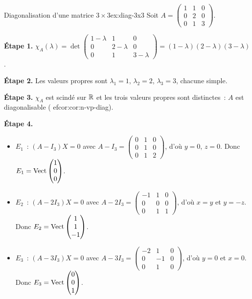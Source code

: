 \begin{example}{Diagonalisation d'une matrice $3\times 3$}{ex:diag-3x3}
  Soit $A=\begin{pmatrix}1&1&0\\0&2&0\\0&1&3\end{pmatrix}$.

  \textbf{Étape 1.}
  $\chi_A(\lambda)=\det\begin{pmatrix}1-\lambda&1&0\\0&2-\lambda&0\\
  0&1&3-\lambda\end{pmatrix}
  =(1-\lambda)(2-\lambda)(3-\lambda)$.

  \textbf{Étape 2.} Les valeurs propres sont $\lambda_1=1$,
  $\lambda_2=2$, $\lambda_3=3$, chacune simple.

  \textbf{Étape 3.} $\chi_A$ est scindé sur ${\mathbb{R}}$ et les trois valeurs
  propres sont distinctes~: $A$ est diagonalisable
  (
ef{cor:cor:n-vp-diag}).

  \textbf{Étape 4.}
  \begin{itemize}
    \item $E_1$~: $(A-I_3)X=0$ avec
      $A-I_3=\begin{pmatrix}0&1&0\\0&1&0\\0&1&2\end{pmatrix}$, d'où
      $y=0$, $z=0$. Donc
      $E_1=\operatorname{Vect}\begin{pmatrix}1\\0\\0\end{pmatrix}$.
    \item $E_2$~: $(A-2I_3)X=0$ avec
      $A-2I_3=\begin{pmatrix}-1&1&0\\0&0&0\\0&1&1\end{pmatrix}$, d'où
      $x=y$ et $y=-z$. Donc
      $E_2=\operatorname{Vect}\begin{pmatrix}1\\1\\-1\end{pmatrix}$.
    \item $E_3$~: $(A-3I_3)X=0$ avec
      $A-3I_3=\begin{pmatrix}-2&1&0\\0&-1&0\\0&1&0\end{pmatrix}$, d'où
      $y=0$ et $x=0$. Donc
      $E_3=\operatorname{Vect}\begin{pmatrix}0\\0\\1\end{pmatrix}$.


\end{itemize}
\end{example}
